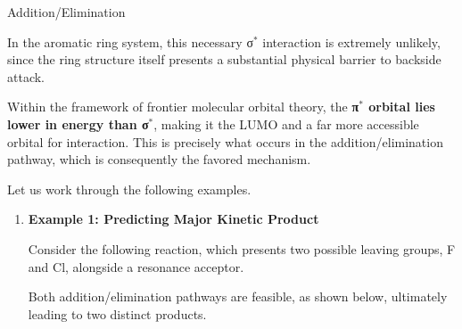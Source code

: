 \begin{core}[label=core:add_elim]{Addition/Elimination}

      In the aromatic ring system, this necessary σ$^*$ interaction is extremely unlikely, since the ring structure itself presents a substantial physical barrier to backside attack.

      Within the framework of frontier molecular orbital theory, the \textbf{π$^*$ orbital lies lower in energy than σ$^*$}, making it the LUMO and a far more accessible orbital for interaction. This is precisely what occurs in the addition/elimination pathway, which is consequently the favored mechanism.

      Let us work through the following examples.

      \begin{enumerate}

        \item \textbf{Example 1: Predicting Major Kinetic Product}

        Consider the following reaction, which presents two possible leaving groups, F and Cl, alongside a  resonance acceptor.


        Both addition/elimination pathways are feasible, as shown below, ultimately leading to two distinct products.


\end{enumerate}
\end{core}
